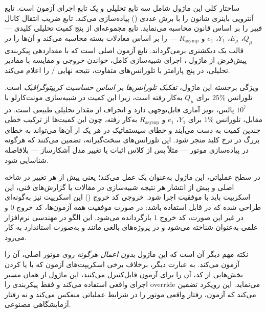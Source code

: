 ساختار کلی این ماژول شامل سه تابع تحلیلی و یک تابع اجرای آزمون است. تابع  آنتروپی باینری شانون را با برش عددی () پیاده‌سازی می‌کند. تابع  ضریب انتقال کانال فیبر را بر اساس قانون  محاسبه می‌نماید. تابع  مجموعه‌ای از پنج کمیت تحلیلی کلیدی — $Q_\mu$، $E_\mu$، $Y_1$، $e_1$ و $R_{\text{asymp}}$ — را بر اساس معادلات بسته  محاسبه می‌کند و آن‌ها را در قالب یک دیکشنری برمی‌گرداند. تابع  آزمون اصلی است که با مقداردهی پیکربندی پیش‌فرض  از ماژول ، اجرای شبیه‌سازی کامل، خواندن خروجی  و مقایسه با مقادیر تحلیلی، در پنج پارامتر با تلورانس‌های متفاوت، نتیجه نهایی / را اعلام می‌کند.

ویژگی برجسته این ماژول، \emph{تفکیک تلورانس‌ها بر اساس حساسیت کریپتوگرافیک} است. تلورانس $25\%$ برای $Q_\mu$ به‌کار رفته است، زیرا این کمیت در شبیه‌سازی مونت‌کارلو با $10^7$ پالس، نویز آماری قابل‌توجهی دارد و انحراف از مقدار تحلیلی طبیعی است. در مقابل، تلورانس $1\%$ برای $Y_1$، $e_1$ و $R_{\text{asymp}}$ به‌کار رفته، چون این کمیت‌ها از ترکیب خطی چندین کمیت به دست می‌آیند و خطای سیستماتیک در هر یک از آن‌ها می‌تواند به خطای بزرگ در نرخ کلید منجر شود. این تلورانس‌های سخت‌گیرانه، تضمین می‌کنند که هرگونه  در پیاده‌سازی موتور — مثلاً پس از  کلاس اثبات یا تغییر مدل آشکارساز — بلافاصله شناسایی شود.

در سطح عملیاتی، این ماژول به‌عنوان یک  عمل می‌کند؛ یعنی پیش از  هر تغییر در شاخه اصلی و پیش از انتشار هر نتیجه شبیه‌سازی در مقالات یا گزارش‌های فنی، این اسکریپت باید با موفقیت اجرا شود. خروجی کد خروج () این اسکریپت نیز به‌گونه‌ای طراحی شده که در  قابل استفاده باشد: در صورت موفقیت همه آزمون‌ها، کد خروج $0$ و در غیر این صورت، کد خروج $1$ بازگردانده می‌شود. این الگو در مهندسی نرم‌افزار علمی به‌عنوان  شناخته می‌شود و در پروژه‌های بالغی مانند  و  به‌صورت استاندارد به کار می‌رود.

نکته مهم دیگر آن است که این ماژول \emph{بدون اعمال هرگونه } روی موتور اصلی، آن را آزمون می‌کند. به عبارت دیگر، برخلاف برخی اسکریپت‌های آزمون که با  یا  کردن بخش‌هایی از کد، آن را برای آزمون قابل‌کنترل می‌کنند، این ماژول از همان مسیر اجرای واقعی  استفاده می‌کند و فقط پیکربندی را override می‌نماید. این رویکرد تضمین می‌کند که آزمون، رفتار واقعی موتور را در شرایط عملیاتی منعکس می‌کند و نه رفتار آزمایشگاهی مصنوعی.

